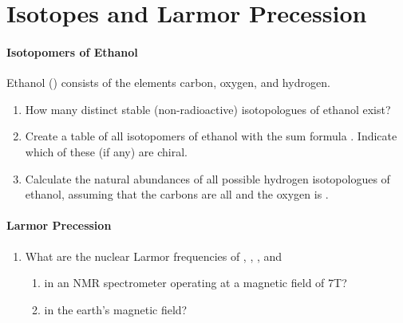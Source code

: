\documentclass{chem6155problemset}
\begin{document}
\section{Isotopes and Larmor Precession}
\paragraph{Isotopomers of Ethanol}
	Ethanol () consists of the elements carbon, oxygen, and hydrogen.
	\begin{enumerate}
	\item How many distinct stable (non-radioactive) isotopologues of ethanol exist?
	\item Create a table of all isotopomers of ethanol with the sum formula
	 . Indicate which of these (if any) are chiral.
	\item Calculate the natural abundances of all possible hydrogen isotopologues of ethanol, assuming
	that the carbons are  all  and the oxygen is .
	\end{enumerate}


\paragraph{Larmor Precession}
   \begin{enumerate}[resume]
   		\item What are the nuclear Larmor frequencies of , ,
		,
		and 
		\begin{enumerate}
			\item in an NMR spectrometer operating at a magnetic field of 7T?
			\item in the earth's magnetic field?
		\end{enumerate}
   \end{enumerate}
\end{document}

